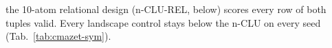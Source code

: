 \documentclass{article} %
\begin{document}
the 10-atom relational
design (n-CLU-REL, below) scores every row of both tuples valid. %
Every landscape
control stays below the n-CLU on every seed (Tab.~\ref{tab:cmazet-sym}).

\end{document}
